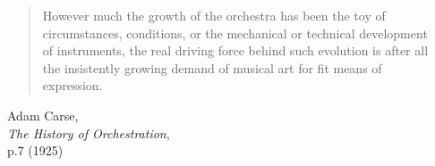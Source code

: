 \begin{frame}
    
    \begin{columns}[T]
        \begin{column}{0.7\textwidth}
			    \begin{quote}
						However much the growth of the orchestra has been
						the toy of circumstances, conditions, or the mechanical or
						technical development of instruments, the real driving force
						behind such evolution is after all the insistently growing demand
						of musical art for fit means of expression.
			    \end{quote}
			    \begin{flushright}
			        Adam Carse,\\\emph{The History of Orchestration},\\p.7 (1925)
			    \end{flushright}
        \end{column}
        \begin{column}{0.3\textwidth}
            \begin{center}
            \end{center}
        \end{column}
    \end{columns}

\end{frame}
  

